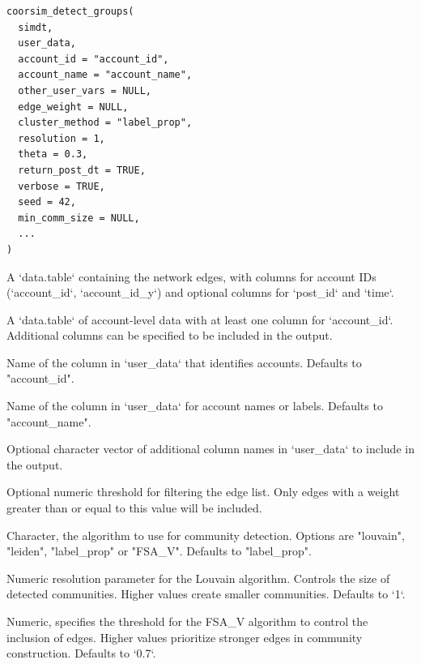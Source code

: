 \documentclass[a4paper]{book}
\begin{document}
%
\begin{Usage}
\begin{verbatim}
coorsim_detect_groups(
  simdt,
  user_data,
  account_id = "account_id",
  account_name = "account_name",
  other_user_vars = NULL,
  edge_weight = NULL,
  cluster_method = "label_prop",
  resolution = 1,
  theta = 0.3,
  return_post_dt = TRUE,
  verbose = TRUE,
  seed = 42,
  min_comm_size = NULL,
  ...
)
\end{verbatim}
\end{Usage}
%
\begin{Arguments}
\begin{ldescription}
\item[\code{simdt}] A `data.table` containing the network edges, with columns for account IDs 
(`account\_id`, `account\_id\_y`) and optional columns for `post\_id` and `time`.

\item[\code{user\_data}] A `data.table` of account-level data with at least one column for `account\_id`. 
Additional columns can be specified to be included in the output.

\item[\code{account\_id}] Name of the column in `user\_data` that identifies accounts. Defaults to "account\_id".

\item[\code{account\_name}] Name of the column in `user\_data` for account names or labels. Defaults to "account\_name".

\item[\code{other\_user\_vars}] Optional character vector of additional column names in `user\_data` 
to include in the output.

\item[\code{edge\_weight}] Optional numeric threshold for filtering the edge list. 
Only edges with a weight greater than or equal to this value will be included.

\item[\code{cluster\_method}] Character, the algorithm to use for community detection. 
Options are "louvain", "leiden", "label\_prop" or "FSA\_V". Defaults to "label\_prop".

\item[\code{resolution}] Numeric resolution parameter for the Louvain algorithm. 
Controls the size of detected communities. Higher values create smaller communities. Defaults to `1`.

\item[\code{theta}] Numeric, specifies the threshold for the FSA\_V algorithm to control 
the inclusion of edges. Higher values prioritize stronger edges in community construction. Defaults to `0.7`.


\end{ldescription}
\end{Arguments}
\end{document}
